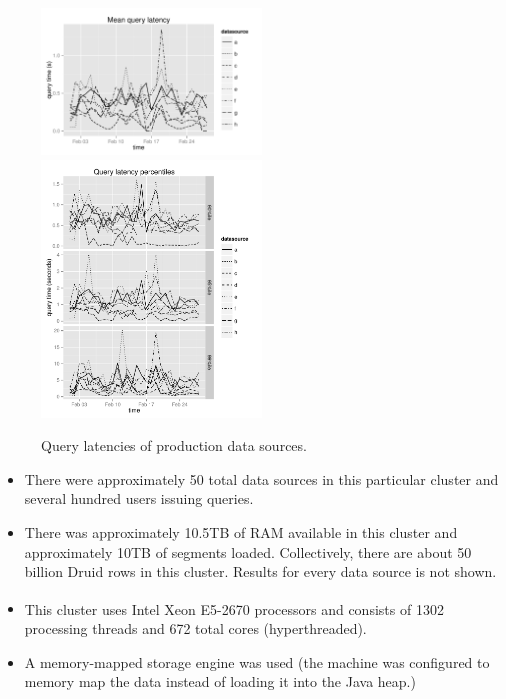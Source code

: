 \documentclass{vldb}
\begin{document}
\begin{figure}
\centering
\includegraphics[width = 2.3in]{avg_query_latency}
\includegraphics[width = 2.3in]{query_percentiles}
\caption{Query latencies of production data sources.}
\label{fig:query_latency}
\end{figure}
\begin{itemize}[leftmargin=*,beginpenalty=5000,topsep=0pt]

\item There were
approximately 50 total data sources in this particular cluster and several hundred users issuing
queries.

\item There was approximately 10.5TB of RAM available in this cluster and
approximately 10TB of segments loaded. Collectively,
there are about 50 billion Druid rows in this cluster. Results for
every data source is not shown.

\item This cluster uses Intel\textsuperscript{\textregistered} Xeon\textsuperscript{\textregistered} E5-2670 processors and consists of 1302 processing
threads and 672 total cores (hyperthreaded).

\item A memory-mapped storage engine was used (the machine was configured to
    memory map the data instead of loading it into the Java heap.)
\end{itemize}
\end{document}
